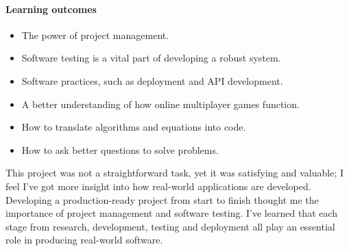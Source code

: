 \paragraph{Learning outcomes}
\begin{itemize}
	\item The power of project management.
	\item Software testing is a vital part of developing a robust system.
	\item Software practices, such as deployment and API development.
	\item A better understanding of how online multiplayer games function.
	\item How to translate algorithms and equations into code.	
	\item How to ask better questions to solve problems.  
\end{itemize}

This project was not a straightforward task, yet it was satisfying and valuable; I feel I've got more insight into how real-world applications are developed. Developing a production-ready project from start to finish thought me the importance of project management and software testing. I've learned that each stage from research, development, testing and deployment all play an essential role in producing real-world software.
